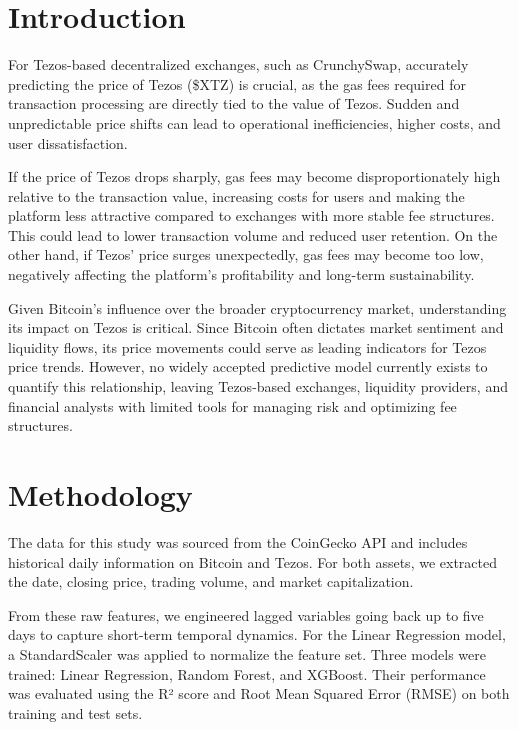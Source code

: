\documentclass[a0,portrait]{hogent-poster}
\begin{document}
\begin{multicols}{3} %

\section{Introduction}

For Tezos-based decentralized exchanges, such as CrunchySwap, accurately predicting the price of Tezos (\$XTZ) is crucial, as the gas fees required for transaction processing are directly tied to the value of Tezos. Sudden and unpredictable price shifts can lead to operational inefficiencies, higher costs, and user dissatisfaction.

If the price of Tezos drops sharply, gas fees may become disproportionately high relative to the transaction value, increasing costs for users and making the platform less attractive compared to exchanges with more stable fee structures. This could lead to lower transaction volume and reduced user retention. On the other hand, if Tezos' price surges unexpectedly, gas fees may become too low, negatively affecting the platform’s profitability and long-term sustainability.

Given Bitcoin’s influence over the broader cryptocurrency market, understanding its impact on Tezos is critical. Since Bitcoin often dictates market sentiment and liquidity flows, its price movements could serve as leading indicators for Tezos price trends. However, no widely accepted predictive model currently exists to quantify this relationship, leaving Tezos-based exchanges, liquidity providers, and financial analysts with limited tools for managing risk and optimizing fee structures.

\section{Methodology}

The data for this study was sourced from the CoinGecko API and includes historical daily information on Bitcoin and Tezos. 
For both assets, we extracted the date, closing price, trading volume, and market capitalization. 

From these raw features, we engineered lagged variables going back up to five days to capture short-term temporal dynamics. For the Linear Regression model, a StandardScaler was applied to normalize the feature set. Three models were trained: Linear Regression, Random Forest, and XGBoost. 
Their performance was evaluated using the R² score and Root Mean Squared Error (RMSE) on both training and test sets.


\end{multicols}
\end{document}
